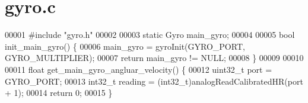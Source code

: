 \section{gyro.\+c}
\label{gyro_8c_source}

\begin{DoxyCode}
00001 \textcolor{preprocessor}{#include "gyro.h"}
00002 
00003 \textcolor{keyword}{static} Gyro main_gyro;
00004 
00005 \textcolor{keywordtype}{bool} init_main_gyro() \{
00006   main_gyro = gyroInit(GYRO_PORT, GYRO_MULTIPLIER);
00007   \textcolor{keywordflow}{return} main_gyro != NULL;
00008 \}
00009 
00010 
00011 \textcolor{keywordtype}{float} get_main_gyro_angluar_velocity() \{
00012   uint32\_t port = GYRO_PORT;
00013   int32\_t reading = (int32\_t)analogReadCalibratedHR(port + 1);
00014     \textcolor{keywordflow}{return} 0;
00015 \}
\end{DoxyCode}
